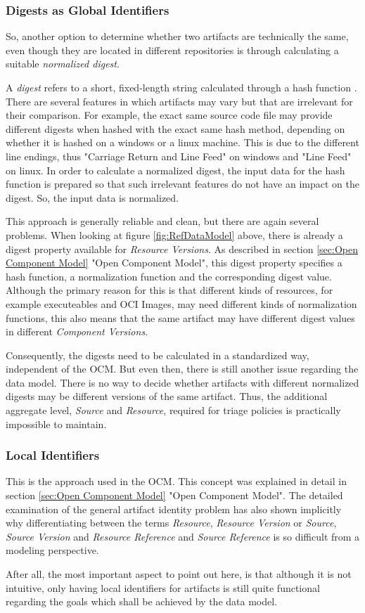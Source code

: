 \subsubsection{Digests as Global Identifiers} 
So, another option to determine whether two artifacts are technically the same, even though they are located in different repositories is through calculating a suitable \emph{normalized digest}.\par 
A \emph{digest} refers to a short, fixed-length string calculated through a hash function \cite{Cryptography}. There are several features in which artifacts may vary but that are irrelevant for their comparison. For example, the exact same source code file may provide different digests when hashed with the exact same hash method, depending on whether it is hashed on a windows or a linux machine. This is due to the different line endings, thus "Carriage Return and Line Feed" on windows and "Line Feed" on linux. In order to calculate a normalized digest, the input data for the hash function is prepared so that such irrelevant features do not have an impact on the digest. So, the input data is normalized.\par
This approach is generally reliable and clean, but there are again several problems. When looking at figure \ref{fig:RefDataModel} above, there is already a digest property available for \emph{Resource Versions}. As described in section \ref{sec:Open Component Model} "Open Component Model", this digest property specifies a hash function, a normalization function and the corresponding digest value. Although the primary reason for this is that different kinds of resources, for example executeables and OCI Images, may need different kinds of normalization functions, this also means that the same artifact may have different digest values in different \emph{Component Versions}.\par
Consequently, the digests need to be calculated in a standardized way, independent of the OCM. But even then, there is still another issue regarding the data model. There is no way to decide whether artifacts with different normalized digests may be different versions of the same artifact. Thus, the additional aggregate level, \emph{Source} and \emph{Resource}, required for triage policies is practically impossible to maintain.

\subsubsection{Local Identifiers}
This is the approach used in the OCM. This concept was explained in detail in section \ref{sec:Open Component Model} "Open Component Model". The detailed examination of the general artifact identity problem has also shown implicitly why differentiating between the terms \emph{Resource}, \emph{Resource Version} or \emph{Source}, \emph{Source Version} and \emph{Resource Reference} and \emph{Source Reference} is so difficult from a modeling perspective.\par
After all, the most important aspect to point out here, is that although it is not intuitive, only having local identifiers for artifacts is still quite functional regarding the goals which shall be achieved by the data model.

